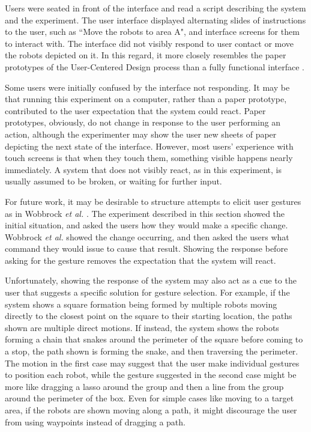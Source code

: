 Users were seated in front of the interface and read a script describing the system and the experiment. The user interface displayed alternating slides of instructions to the user, such as ``Move the robots to area A", and interface screens for them to interact with. 
The interface did not visibly respond to user contact or move the robots depicted on it.
In this regard, it more closely resembles the paper prototypes of the User-Centered Design process than a fully functional interface \citep{ehn1992cardboard}.

Some users were initially confused by the interface not responding. 
It may be that running this experiment on a computer, rather than a paper prototype, contributed to the user expectation that the system could react.
Paper prototypes, obviously, do not change in response to the user performing an action, although the experimenter may show the user new sheets of paper depicting the next state of the interface. 
However, most users' experience with touch screens is that when they touch them, something visible happens nearly immediately. 
A system that does not visibly react, as in this experiment, is usually assumed to be broken, or waiting for further input.

For future work, it may be desirable to structure attempts to elicit user gestures as in Wobbrock \emph{et al.} \citep{wobbrock2009user}. 
The experiment described in this section showed the initial situation, and asked the users how they would make a specific change. 
Wobbrock \emph{et al.} showed the change occurring, and then asked the users what command they would issue to cause that result. 
Showing the response before asking for the gesture removes the expectation that the system will react. 

Unfortunately, showing the response of the system may also act as a cue to the user that suggests a specific solution for gesture selection. 
For example, if the system shows a square formation being formed by multiple robots moving directly to the closest point on the square to their starting location, the paths shown are multiple direct motions. 
If instead, the system shows the robots forming a chain that snakes around the perimeter of the square before coming to a stop, the path shown is forming the snake, and then traversing the perimeter. 
The motion in the first case may suggest that the user make individual gestures to position each robot, while the gesture suggested in the second case might be more like dragging a lasso around the group and then a line from the group around the perimeter of the box. 
Even for simple cases like moving to a target area, if the robots are shown moving along a path, it might discourage the user from using waypoints instead of dragging a path.


